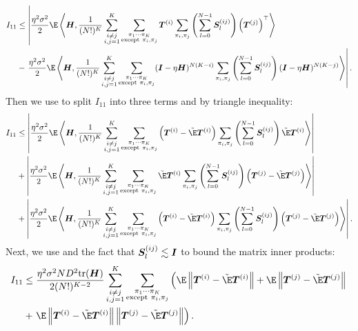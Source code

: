 \begin{align*}
    I_{11}&\leq\left|\frac{\eta^2\sigma^2}{2}\E\inp{\mH}{\frac{1}{(N!)^K}\sum_{\substack{i\neq j \\i,j=1}}^K\sum_{\substack{\pi_1\cdots \pi_K \\ \text{except} ~\pi_i, \pi_j}}\mT^{(i)}\sum_{\pi_i, \pi_j}\left(\sum_{l=0}^{N-1}\mS_l^{(ij)}\right)\left(\mT^{(j)}\right)^{\top}}\right. \\
    &-\left.\frac{\eta^2\sigma^2}{2}\E\inp{\mH}{\frac{1}{(N!)^K}\sum_{\substack{i\neq j \\i,j=1}}^K\sum_{\substack{\pi_1\cdots \pi_K \\ \text{except} ~\pi_i, \pi_j}}(\mI-\eta\mH)^{N(K-i)}\sum_{\pi_i, \pi_j}\left(\sum_{l=0}^{N-1}\mS_l^{(ij)}\right)(\mI-\eta\mH)^{N(K-j)}}\right| .\\
\end{align*}
Then we use  to split $I_{11}$ into three terms and by triangle inequality:
\begin{align*}
    I_{11}&\leq\left|\frac{\eta^2\sigma^2}{2}\E\inp{\mH}{\frac{1}{(N!)^K}\sum_{\substack{i\neq j \\i,j=1}}^K\sum_{\substack{\pi_1\cdots \pi_K \\ \text{except} ~\pi_i, \pi_j}}\left(\mT^{(i)}-\fakeE\mT^{(i)}\right)\sum_{\pi_i, \pi_j}\left(\sum_{l=0}^{N-1}\mS_l^{(ij)}\right)\fakeE\mT^{(i)}}\right| \\
    &+\left|\frac{\eta^2\sigma^2}{2}\E\inp{\mH}{\frac{1}{(N!)^K}\sum_{\substack{i\neq j \\i,j=1}}^K\sum_{\substack{\pi_1\cdots \pi_K \\ \text{except} ~\pi_i, \pi_j}}\fakeE\mT^{(i)}\sum_{\pi_i, \pi_j}\left(\sum_{l=0}^{N-1}\mS_l^{(ij)}\right)\left(\mT^{(j)}-\fakeE\mT^{(j)}\right)}\right| \\
    &+\left|\frac{\eta^2\sigma^2}{2}\E\inp{\mH}{\frac{1}{(N!)^K}\sum_{\substack{i\neq j \\i,j=1}}^K\sum_{\substack{\pi_1\cdots \pi_K \\ \text{except} ~\pi_i, \pi_j}}\left(\mT^{(i)}-\fakeE\mT^{(i)}\right)\sum_{\pi_i, \pi_j}\left(\sum_{l=0}^{N-1}\mS_l^{(ij)}\right)\left(\mT^{(j)}-\fakeE\mT^{(j)}\right)}\right|. \\
\end{align*}
Next, we use  and the fact that ${\bm{S}}_l^{(ij)}\lesssim{\bm{I}}$ to bound the matrix inner products:
\begin{align*}       
    I_{11}&\leq \frac{\eta^2\sigma^2ND^2\text{tr}(\mH)}{2(N!)^{K-2}}\sum_{\substack{i\neq j \\i,j=1}}^K\sum_{\substack{\pi_1\cdots \pi_K \\ \text{except} ~\pi_i, \pi_j}}\left(\E\left\|\mT^{(i)}-\fakeE\mT^{(i)}\right\|+\E\left\|\mT^{(j)}-\fakeE\mT^{(j)}\right\|\right. \\
    &+\left.\E\left\|\mT^{(i)}-\fakeE\mT^{(i)}\right\|\left\|\mT^{(j)}-\fakeE\mT^{(j)}\right\|\right). \\
\end{align*}
